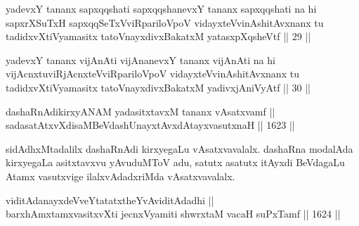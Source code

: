 \begin{shl}
yadevxY tananx sapxqqshati sapxqqshanevxY tananx sapxqqshati na hi sapxrXSuTxH sapxqqSeTxVviRpariloVpoV vidayxteV\s vinAshitAvxnanx tu tadidxvXtiVyamasitx tatoV\s nayxdivxBakatxM yatasxpXqsheVtf || 29 ||
\end{shl}

\begin{shl}
yadevxY tananx vijAnAti vijAnanevxY tananx vijAnAti na hi vijAcnxtuviRjAcnxteVviRpariloVpoV vidayxteV\s vinAshitAvxnanx tu tadidxvXtiVyamasitx tatoV\s nayxdivxBakatxM yadivxjAniVyAtf || 30 ||
\end{shl}


\begin{shl}
dashaRnAdikirxyANAM yadasitxtavxM tananx vAsatxvamf || \\
sadasatAtxvXdisaMBeVdashUnayxtAvxdAtayxvasutxnaH ||  1623 ||  
\end{shl}

\begin{artha}
sidAdhxMtadalilx dashaRnAdi kirxyegaLu vAsatxvavalalx. dashaRna modalAda kirxyegaLa asitxtavxvu yAvuduMToV adu, satutx asatutx itAyxdi BeVdagaLu Atamx vasutxvige ilalxvAdadxriMda vAsatxvavalalx.
\end{artha}


\begin{shl}
viditAdanayxdeVveYtatatxtheYvAviditAdadhi || \\
barxhAmxtamxvasitxvXti jecnxVyamiti shwrxtaM vacaH suPxTamf ||  1624 ||  
\end{shl}

